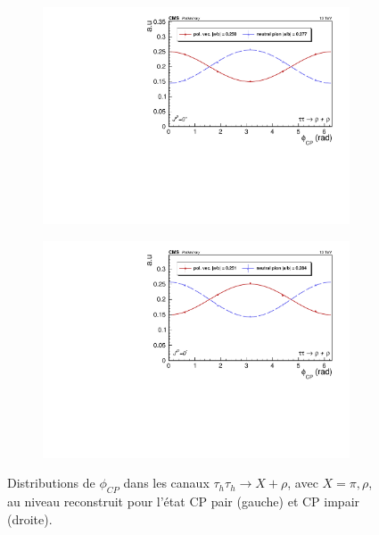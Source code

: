 \begin{figure}[!ht]
  \begin{subfigure}[b]{0.5\linewidth}
    \centering
    \includegraphics[width=\linewidth]{Chapitre6/Images/RHORHO/RHORHO_even_reco.pdf} 
    \caption*{} 
    \vspace{0.5ex}
  \end{subfigure}%
  \begin{subfigure}[b]{0.5\linewidth}
    \centering
    \includegraphics[width=\linewidth]{Chapitre6/Images/RHORHO/RHORHO_odd_reco.pdf} 
    \caption*{} 
    \vspace{0.5ex}
  \end{subfigure} 
  \caption{Distributions de $\phi_{CP}$ dans les canaux $\tau_h\tau_h\rightarrow X+\rho$, avec $X=\pi,\rho$, au niveau reconstruit pour l'état CP pair (gauche) et CP impair (droite).}
  \label{CPrecoXPI}
\end{figure}

